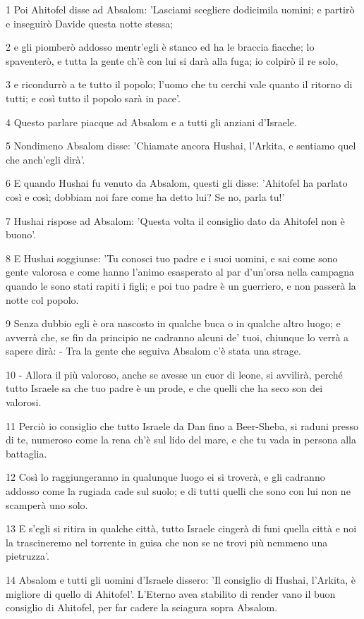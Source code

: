 \par 1 Poi Ahitofel disse ad Absalom: 'Lasciami scegliere dodicimila uomini; e partirò e inseguirò Davide questa notte stessa;
\par 2 e gli piomberò addosso mentr'egli è stanco ed ha le braccia fiacche; lo spaventerò, e tutta la gente ch'è con lui si darà alla fuga; io colpirò il re solo,
\par 3 e ricondurrò a te tutto il popolo; l'uomo che tu cerchi vale quanto il ritorno di tutti; e così tutto il popolo sarà in pace'.
\par 4 Questo parlare piacque ad Absalom e a tutti gli anziani d'Israele.
\par 5 Nondimeno Absalom disse: 'Chiamate ancora Hushai, l'Arkita, e sentiamo quel che anch'egli dirà'.
\par 6 E quando Hushai fu venuto da Absalom, questi gli disse: 'Ahitofel ha parlato così e così; dobbiam noi fare come ha detto lui? Se no, parla tu!'
\par 7 Hushai rispose ad Absalom: 'Questa volta il consiglio dato da Ahitofel non è buono'.
\par 8 E Hushai soggiunse: 'Tu conosci tuo padre e i suoi uomini, e sai come sono gente valorosa e come hanno l'animo esasperato al par d'un'orsa nella campagna quando le sono stati rapiti i figli; e poi tuo padre è un guerriero, e non passerà la notte col popolo.
\par 9 Senza dubbio egli è ora nascosto in qualche buca o in qualche altro luogo; e avverrà che, se fin da principio ne cadranno alcuni de' tuoi, chiunque lo verrà a sapere dirà: - Tra la gente che seguiva Absalom c'è stata una strage.
\par 10 - Allora il più valoroso, anche se avesse un cuor di leone, si avvilirà, perché tutto Israele sa che tuo padre è un prode, e che quelli che ha seco son dei valorosi.
\par 11 Perciò io consiglio che tutto Israele da Dan fino a Beer-Sheba, si raduni presso di te, numeroso come la rena ch'è sul lido del mare, e che tu vada in persona alla battaglia.
\par 12 Così lo raggiungeranno in qualunque luogo ei si troverà, e gli cadranno addosso come la rugiada cade sul suolo; e di tutti quelli che sono con lui non ne scamperà uno solo.
\par 13 E s'egli si ritira in qualche città, tutto Israele cingerà di funi quella città e noi la trascineremo nel torrente in guisa che non se ne trovi più nemmeno una pietruzza'.
\par 14 Absalom e tutti gli uomini d'Israele dissero: 'Il consiglio di Hushai, l'Arkita, è migliore di quello di Ahitofel'. L'Eterno avea stabilito di render vano il buon consiglio di Ahitofel, per far cadere la sciagura sopra Absalom.
